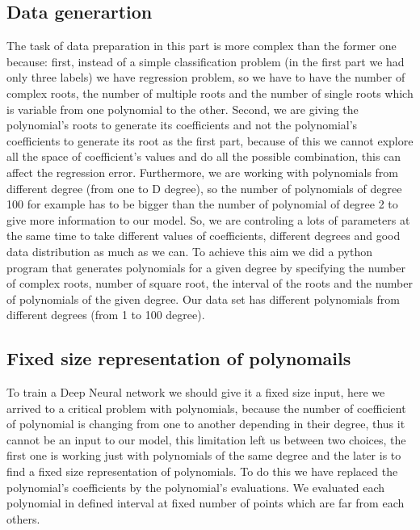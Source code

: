 \documentclass[a4paper,UKenglish]{lipics-v2016}
\begin{document}
 \subsection{Data generartion\label{data generation}}

 The task of data preparation in this part is more complex than the former one because: first, instead of a simple classification problem (in the first part we had only three labels) we have regression problem, so we have to have the number of complex roots, the number of multiple roots and the number of single roots which is variable from one polynomial to the other. Second, we are giving the polynomial’s roots to generate its coefficients and not the polynomial’s coefficients to generate its root as the first part, because of this we cannot explore all the space of coefficient's values and do all the possible combination, this can affect the regression error. Furthermore, we are working with polynomials from different degree (from one to D degree), so the number of polynomials of degree 100 for example has to be bigger than the number of polynomial of degree 2 to give more information to our model. So, we are controling a lots of parameters at the same time to take different values of coefficients, different degrees and good data distribution as much as we can. To achieve this aim we did a python program that generates polynomials for a given degree by specifying the number of complex roots, number of square root, the interval of the roots and the number of polynomials of the given degree. Our data set has different polynomials from different degrees (from 1 to 100 degree).

 \subsection{Fixed size representation of polynomails\label{evaluation}}

 To train a Deep Neural network we should give it a fixed size input, here we arrived to a critical  problem with polynomials, because the number of coefficient of polynomial is changing from one to another depending in their degree, thus it cannot be an input to our model, this limitation  left us between two choices, the first one is working just with polynomials of the same degree and the later is to find a fixed size representation of polynomials. To do this we have replaced the polynomial’s coefficients by the polynomial’s evaluations. We evaluated each polynomial in defined interval at fixed number of points which are far from each others.
\end{document}
